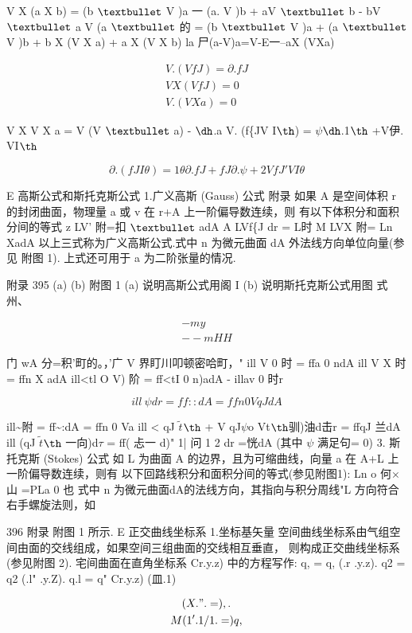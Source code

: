 V X (a X b) = (b ${\rm •}$ V )a 一 (a. V )b + aV ${\rm •}$ b - bV ${\rm •}$ a V (a ${\rm •}$ 的 = (b ${\rm •}$ V )a + (a ${\rm •}$ V )b + b X (V X a) + a X (V X b) la 尸(a-V)a=V-E一--aX (VXa)

\begin{gather*}
V. (VfJ) = \partial .fJ\\
V X (VfJ) = 0\\
V. (V X a) = 0
\end{gather*}

V X V X a = V (V ${\rm •}$ a) - ${\rm ð}$.a V. (f\{JV I${\rm þ}$) = $\psi$${\rm ð}$.1${\rm þ}$ +V伊. VI${\rm þ}$

\[\partial . (fJ I\theta ) = 1\theta \partial .fJ + fJ\partial . \psi + 2 VfJ' VI\theta \]

E 高斯公式和斯托克斯公式 1.广义高斯 (Gauss) 公式 附录 如果 A 是空间体积 r 的封闭曲面，物理量 a 或 v 在 r+A 上一阶偏导数连续，则 有以下体积分和面积分间的等式 z LV' 附=扣 ${\rm •}$ adA A LVf\{J dr = L时 M LVX 附= Ln XadA 以上三式称为广义高斯公式.式中 n 为微元曲面 dA 外法线方向单位向量(参见 附图 1). 上式还可用于 a 为二阶张量的情况.

附录 395 (a) (b) 附图 1 (a) 说明高斯公式用阁 I (b) 说明斯托克斯公式用图 式州、

\begin{gather*}
-my\\
--mHH
\end{gather*}

门 wA 分=积'町的。，'广 V 界盯川叩顿密哈町，" ill V 0 时 = ffa 0 ndA ill V X 时 = ffn X adA ill<tl O V) 阶 = ff<tI 0 n)adA - illav 0 时r

\[ill~\psi dr = ff::dA = ffn 0 VqJ dA\]

ill\textasciitilde{}附 = ff\textasciitilde{}:dA = ffn 0 Va ill < qJ $\tilde{t}$${\rm þ}$ + V qJ$\psi$o Vt${\rm þ}$驯)油d击r = ffqJ 兰dA ill (qJ $\tilde{t}$${\rm þ}$ 一向)d$\tau$ = ff( 忐一 d)" 1| 问 1 2 dr =恍dA (其中 $\psi$ 满足句= 0) 3. 斯托克斯 (Stokes) 公式 如 L 为曲面 A 的边界，且为可缩曲线，向量 a 在 A+L 上一阶偏导数连续，则有 以下回路线积分和面积分间的等式(参见附图1): Ln o 何$\times $山 =PLa 0 也 式中 n 为微元曲面dA的法线方向，其指向与积分周线"L 方向符合右手螺旋法则，如

396 附录 附图 1 所示. E 正交曲线坐标系 1.坐标基矢量 空间曲线坐标系由气组空间由面的交线组成，如果空间三组曲面的交线相互垂直， 则构成正交曲线坐标系(参见附图 2). 宅间曲面在直角坐标系 Cr.y.z) 中的方程写作: q, = q, (.r .y.z). q2 = q2 (.l" .y.Z). q.l = q" Cr.y.z) (皿.1)

\begin{gather*}
(X.".=) ,.\\
M (1'.1/1.=) q,
\end{gather*}

